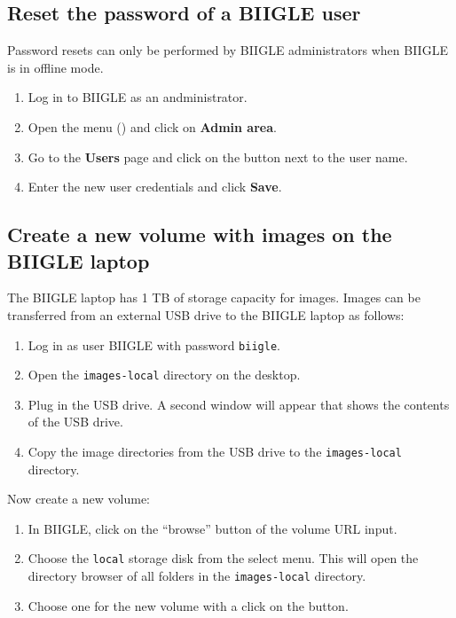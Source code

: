 \subsection*{Reset the password of a BIIGLE user}

Password resets can only be performed by BIIGLE administrators when BIIGLE is in offline mode.

\begin{enumerate}
	\item Log in to BIIGLE as an andministrator.
	\item Open the menu () and click on \textbf{Admin area}.
	\item Go to the \textbf{Users} page and click on the  button next to the user name.
	\item Enter the new user credentials and click \textbf{Save}.
\end{enumerate}

\subsection*{Create a new volume with images on the BIIGLE laptop}

The BIIGLE laptop has 1 TB of storage capacity for images. Images can be transferred from an external USB drive to the BIIGLE laptop as follows:

\begin{enumerate}
	\item Log in as user BIIGLE with password \texttt{biigle}.
	\item Open the \texttt{images-local} directory on the desktop.
	\item Plug in the USB drive. A second window will appear that shows the contents of the USB drive.
	\item Copy the image directories from the USB drive to the \texttt{images-local} directory.
\end{enumerate}

Now create a new volume:

\begin{enumerate}
	\item In BIIGLE, click on the ``browse'' button of the volume URL input.
	\item Choose the \texttt{local} storage disk from the select menu. This will open the directory browser of all folders in the \texttt{images-local} directory.
	\item Choose one for the new volume with a click on the  button.
\end{enumerate}

